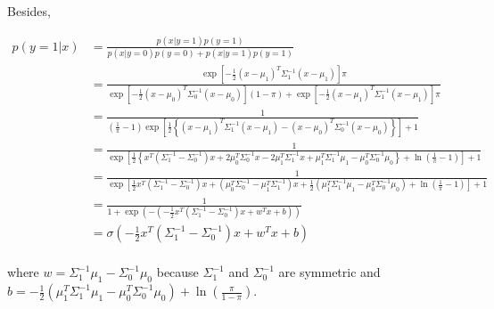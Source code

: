 \documentclass[a4paper, 11pt]{report}
\begin{document}
Besides,

\begin{equation*}
    \begin{aligned}
    p \left( y = 1 | x \right) &= \frac{p \left( x | y = 1 \right) p ( y = 1 )}{p(x | y = 0) p(y = 0) + p(x | y = 1) p(y = 1)} \\
    &= \frac{\exp \left[ - \frac{1}{2} \left( x - \mu_{1} \right)^{T} \Sigma^{-1}_1 \left( x - \mu_{1} \right) \right] \pi}{\exp \left[ - \frac{1}{2} \left( x - \mu_{0} \right)^{T} \Sigma^{-1}_0 \left( x - \mu_{0} \right) \right] \left( 1 - \pi \right) + \exp \left[ - \frac{1}{2} \left( x - \mu_{1} \right)^{T} \Sigma^{-1}_1 \left( x - \mu_{1} \right) \right] \pi} \\
    &= \frac{1}{\left( \frac{1}{\pi} - 1 \right) \exp \left[ \frac{1}{2} \left\{ \left( x - \mu_{1} \right)^{T} \Sigma^{-1}_1 \left( x - \mu_{1} \right) - \left( x - \mu_{0} \right)^{T} \Sigma^{-1}_0 \left( x - \mu_{0} \right) \right\} \right] + 1} \\
    &= \frac{1}{\exp \left[ \frac{1}{2} \left\{ x^T \left(\Sigma^{-1}_1 - \Sigma^{-1}_0 \right) x + 2 \mu_{0}^{T} \Sigma^{-1}_0 x - 2 \mu_{1}^{T} \Sigma^{-1}_1 x + \mu_{1}^{T} \Sigma^{-1}_1 \mu_{1} - \mu_{0}^{T} \Sigma^{-1}_0 \mu_{0} \right\} + \ln \left( \frac{1}{\pi} - 1 \right) \right] + 1} \\
    &= \frac{1}{\exp \left[ \frac{1}{2}  x^T \left(\Sigma^{-1}_1 - \Sigma^{-1}_0 \right) x + \left( \mu_{0}^{T} \Sigma^{-1}_0 - \mu_{1}^{T} \Sigma^{-1}_1 \right) x + \frac{1}{2} \left( \mu_{1}^{T} \Sigma^{-1}_1 \mu_{1} - \mu_{0}^{T} \Sigma^{-1}_0 \mu_{0} \right)  + \ln \left( \frac{1}{\pi} - 1 \right) \right] + 1} \\
    &= \frac{1}{1 + \exp \left( -( - \frac{1}{2}  x^T \left(\Sigma^{-1}_1 - \Sigma^{-1}_0 \right) x + w^{T}x + b) \right)} \\
    &= \sigma \left( - \frac{1}{2}  x^T \left(\Sigma^{-1}_1 - \Sigma^{-1}_0 \right) x + w^{T}x + b \right) \\
    \end{aligned}
\end{equation*}

where $w = \Sigma^{-1}_1 \mu_{1} - \Sigma^{-1}_0 \mu_{0} $ because $\Sigma^{-1}_1$ and $\Sigma^{-1}_0$ are symmetric and $b = -\frac{1}{2} \left( \mu_{1}^{T} \Sigma^{-1}_1 \mu_{1} - \mu_{0}^{T} \Sigma^{-1}_0 \mu_{0} \right) + \ln \left(\frac{\pi}{1-\pi}\right)$.
\end{document}
